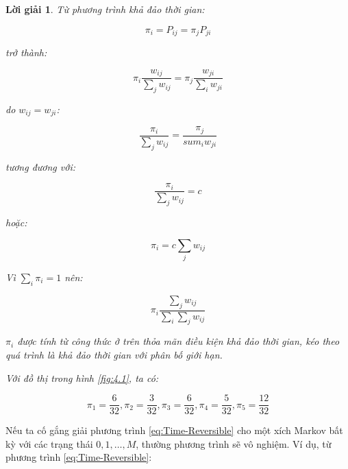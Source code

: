\documentclass[14pt, a4paper]{article}
\numberwithin{equation}{section}
\numberwithin{figure}{section}
\theoremstyle{sltheorem}
\theoremstyle{soltheorem}
\newtheorem*{loigiai}{Lời giải}
\numberwithin{dl}{section}
\numberwithin{md}{section}
\numberwithin{vd}{section}
\begin{document}
    \begin{loigiai}
        Từ phương trình khả đảo thời gian:

        \begin{equation*}
            \pi_i = P_{ij} = \pi_j P_{ji}
        \end{equation*}

        trở thành:

        \begin{equation*}
            \pi_i \dfrac{w_{ij}}{\sum_j w_{ij}} = \pi_j \dfrac{w_{ji}}{\sum_i w_{ji}}
        \end{equation*}

        do $w_{ij} = w_{ji}$:

        \begin{equation*}
            \dfrac{\pi_i}{\sum_j w_{ij}} = \dfrac{\pi_j}{sum_i w_{ji}}
        \end{equation*}

        tương đương với:

        \begin{equation*}
            \dfrac{\pi_i}{\sum_j w_{ij}} = c
        \end{equation*}

        hoặc:

        \begin{equation*}
            \pi_i = c \sum_j w_{ij}
        \end{equation*}

        Vì $\sum_i \pi_i = 1$ nên:

        \begin{equation*}
            \pi_i \dfrac{\sum_j w_{ij}}{\sum_i \sum_j w_{ij}}
        \end{equation*}

        $\pi_i$ được tính từ công thức ở trên thỏa mãn điều kiện khả đảo thời gian, kéo theo quá trình là khả đảo thời gian với phân bố giới hạn.

        Với đồ thị trong hình \ref{fig:4.1}, ta có:

        \begin{equation*}
            \pi_1 = \dfrac{6}{32}, \pi_2 = \dfrac{3}{32}, \pi_3 = \dfrac{6}{32}, \pi_4 = \dfrac{5}{32}, \pi_5 = \dfrac{12}{32}
        \end{equation*}
    \end{loigiai}

    Nếu ta cố gắng giải phương trình \ref{eq:Time-Reversible} cho một xích Markov bất kỳ với các trạng thái $0, 1, \dots, M$, thường phương trình sẽ vô nghiệm.
    Ví dụ, từ phương trình \ref{eq:Time-Reversible}:
\end{document}
